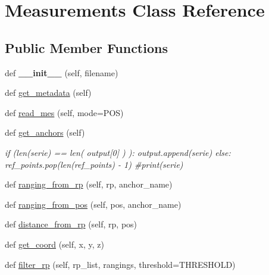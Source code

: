\hypertarget{classread_mes_1_1_measurements}{}\section{Measurements Class Reference}
\label{classread_mes_1_1_measurements}
\subsection*{Public Member Functions}
\begin{DoxyCompactItemize}
\item 
\mbox{\label{classread_mes_1_1_measurements_ad5de178e9da2711c5bc270200dc25568}} 
def {\bfseries \+\_\+\+\_\+init\+\_\+\+\_\+} (self, filename)
\item 
def \mbox{\hyperlink{classread_mes_1_1_measurements_a4bf6b24f95dbd9e6388503f474e0be05}{get\+\_\+metadata}} (self)
\item 
def \mbox{\hyperlink{classread_mes_1_1_measurements_af97d9bc67dffe24a1547fabebc31e9ad}{read\+\_\+mes}} (self, mode=\textquotesingle{}P\+OS\textquotesingle{})
\item 
def \mbox{\hyperlink{classread_mes_1_1_measurements_a9cab236ac56c4f2245c8f87035f736ef}{get\+\_\+anchors}} (self)
\begin{DoxyCompactList}\small\item\em if (len(serie) == len( output\mbox{[}0\mbox{]} ) )\+: output.\+append(serie) else\+: ref\+\_\+points.\+pop(len(ref\+\_\+points) -\/ 1) \#print(serie) \end{DoxyCompactList}\item 
def \mbox{\hyperlink{classread_mes_1_1_measurements_a3720c2eca68a86eb32876fad24d37b65}{ranging\+\_\+from\+\_\+rp}} (self, rp, anchor\+\_\+name)
\item 
def \mbox{\hyperlink{classread_mes_1_1_measurements_a993884eadd2abd392aa1b4d0aca03d57}{ranging\+\_\+from\+\_\+pos}} (self, pos, anchor\+\_\+name)
\item 
def \mbox{\hyperlink{classread_mes_1_1_measurements_ae9f85ff6eeb7be193c52d772e6aeacfb}{distance\+\_\+from\+\_\+rp}} (self, rp, pos)
\item 
def \mbox{\hyperlink{classread_mes_1_1_measurements_aec61a49900a125b0b6f614e94fba7003}{get\+\_\+coord}} (self, x, y, z)
\item 
def \mbox{\hyperlink{classread_mes_1_1_measurements_af98b3c60b52d623f9c69951ff26a2557}{filter\+\_\+rp}} (self, rp\+\_\+list, rangings, threshold=T\+H\+R\+E\+S\+H\+O\+LD)

\end{DoxyCompactItemize}
